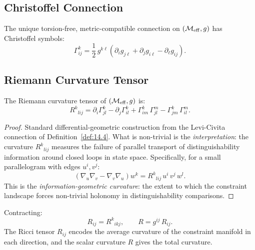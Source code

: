 \subsection{Christoffel Connection}

\begin{definition}\label{def:14.4}
The unique torsion-free, metric-compatible connection on
$(\mathcal{M}_{\mathrm{eff}}, g)$ has Christoffel symbols:
\begin{equation}\label{eq:christoffel}
  \Gamma^k_{ij} = \frac{1}{2}\,g^{k\ell}\left(
    \partial_i g_{j\ell} + \partial_j g_{i\ell}
    - \partial_\ell g_{ij}
  \right).
\end{equation}
\end{definition}

\subsection{Riemann Curvature Tensor}

\begin{theorem}\label{thm:14.4}
The Riemann curvature tensor of $(\mathcal{M}_{\mathrm{eff}}, g)$ is:
\begin{equation}\label{eq:riemann}
  R^k{}_{lij} =
  \partial_i \Gamma^k_{jl} - \partial_j \Gamma^k_{il}
  + \Gamma^k_{im}\,\Gamma^m_{jl}
  - \Gamma^k_{jm}\,\Gamma^m_{il}.
\end{equation}
\end{theorem}

\begin{proof}
Standard differential-geometric construction from the Levi-Civita
connection of Definition~\ref{def:14.4}.  What is non-trivial is the
\emph{interpretation}: the curvature $R^k{}_{lij}$ measures the
failure of parallel transport of distinguishability information around
closed loops in state space.  Specifically, for a small parallelogram
with edges $u^i, v^j$:
\[
  (\nabla_u \nabla_v - \nabla_v \nabla_u) w^k
  = R^k{}_{lij}\,u^i\,v^j\,w^l.
\]
This is the \emph{information-geometric curvature}: the extent to
which the constraint landscape forces non-trivial holonomy in
distinguishability comparisons.
\end{proof}

\begin{corollary}\label{cor:14.2}
Contracting:
\begin{equation}\label{eq:ricci}
  R_{ij} = R^k{}_{ikj}, \qquad
  R = g^{ij}\,R_{ij}.
\end{equation}
The Ricci tensor $R_{ij}$ encodes the average curvature of the
constraint manifold in each direction, and the scalar curvature $R$
gives the total curvature.
\end{corollary}

